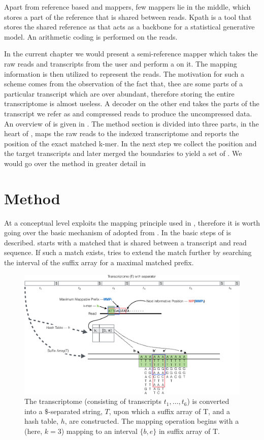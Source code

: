 Apart from reference based and \denovo mappers, few mappers lie in the middle, which  stores a part of the reference that is shared between reads. Kpath \citep{Kingsford2015} is a tool that stores the shared reference as that acts as a backbone for a statistical generative model. An arithmetic coding is performed on the reads.

In the current chapter we would present a semi-reference mapper \quark which takes the raw reads and transcripts from the user and perform a \qm on it. The mapping information is then utilized to represent the reads. The motivation for such a scheme comes from the observation of the fact that, thee are some parts of a particular transcript which are over abundant, therefore storing the entire transcriptome is almost useless. A decoder on the other end takes the parts of the transcript we refer as \iss and compressed reads to produce the uncompressed data. An overview of \quark is given in . The method section is divided into three parts, in the heart of \quark, \qm maps the raw reads to the indexed transcriptome and reports the position of the exact matched k-mer. In the next step we collect the position and the target transcripts and later merged the boundaries to yield a set of \iss. We would go over the method in greater detail in 

\section{Method}\label{sec:quark_method}
At a conceptual level \quark exploits the mapping principle used in \qm, therefore it is worth going over the basic mechanism of \qm adopted from \citet{rapmap}. In  the basic steps of \qm is described. \Qm starts with a matched \kmer that is shared between a transcript and read sequence. If such a match exists, \qm tries to extend the match further by searching the interval of the suffix array for a maximal matched prefix. 

 
\begin{figure}[!ht]
\includegraphics[width=\textwidth]{Figures/overview_quasi}
\centering
\caption{\label{fig:overview_quasi}The transcriptome (consisting of transcripts $t_1,\ldots ,t_6$) is converted into a $\$$-separated string, $T$, upon which a suffix array of T, and a hash table, $h$, are constructed. The mapping operation begins with a \kmer (here, $k=3$) mapping to an interval $\{b,e\}$ in suffix array of T.}
\end{figure}

